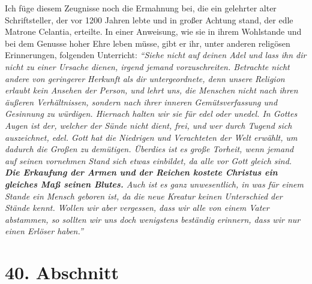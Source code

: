 Ich füge diesem Zeugnisse noch die Ermahnung bei, die ein gelehrter alter
Schriftsteller, der vor 1200 Jahren lebte und in großer Achtung stand, der
edle Matrone Celantia, erteilte. In einer
Anweisung,
wie sie in ihrem
Wohlstande und bei dem Genusse hoher Ehre leben müsse, gibt er ihr, unter
anderen religösen Erinnerungen, folgenden Unterricht:
\textit{"`Siehe nicht auf deinen
Adel und lass ihn dir nicht zu einer Ursache dienen, irgend jemand
vorzuschreiten. Betrachte nicht andere von geringerer Herkunft als dir
untergeordnete, denn unsere Religion erlaubt kein Ansehen der Person, und
lehrt uns, die Menschen nicht nach ihren äußeren Verhältnissen, sondern nach
ihrer inneren Gemütsverfassung und Gesinnung zu würdigen. Hiernach halten wir
sie für edel oder unedel. In Gottes Augen ist der, welcher der Sünde nicht
dient, frei, und wer durch Tugend sich auszeichnet, edel. Gott hat die
Niedrigen und Verachteten der Welt erwählt, um dadurch die Großen zu demütigen.
Überdies ist es große Torheit, wenn jemand auf seinen vornehmen Stand sich
etwas einbildet, da alle vor Gott gleich sind. \label{ref:09_39_erettung}
\textbf{Die Erkaufung der Armen und der
Reichen kostete Christus ein gleiches Maß seinen Blutes.} Auch ist es ganz
unwesentlich, in was für einem Stande ein Mensch geboren ist, da die neue
Kreatur keinen Unterschied der Stände kennt. Wollen wir aber vergessen, dass wir
alle von einem Vater abstammen, so sollten wir uns doch wenigstens beständig
erinnern, dass wir nur einen Erlöser haben."'}

\section{40. Abschnitt} \label{kap9_ab40}

